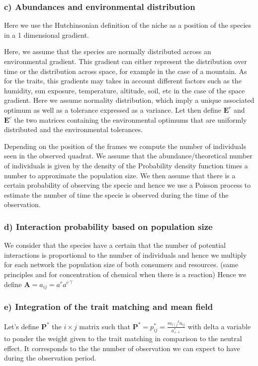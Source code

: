 \documentclass{article}
\begin{document}
\subsubsection{c) Abundances and environmental distribution}
Here we use the Hutchinsonian definition of the niche as a position of the species in a 1 dimensional gradient.

Here, we assume that the species are normally distributed across an environmental gradient. This gradient can either represent the distribution over time or the distribution across space, for example in the case of a mountain. As for the traits, this gradients may takes in account different factors such as the humidity, sun exposure, temperature, altitude, soil, etc in the case of the space gradient.
Here we assume normality distribution, which imply a unique associated optimum as well as a tolerance expressed as a variance. Let then define $\textbf{E}^r$ and $\textbf{E}^c$ the two matrices containing the environmental optimums that are uniformly distributed and the environmental tolerances.

Depending on the position of the frames we compute the number of individuals seen in the observed quadrat. We assume that the abundance/theoretical number of individuals is given by the density of the Probability density function times a number to approximate the population size. We then assume that there is a certain probability of observing the specie and hence we use a Poisson process to estimate the number of time the specie is observed during the time of the observation.


\subsubsection{d) Interaction probability based on population size}
We consider that the species have a certain that the number of potential interactions is proportional to the number of individuals and hence we multiply for each network the population size of both consumers and resources. (same principles and for concentration of chemical when there is a reaction)
Hence we define $\textbf{A} = a_{ij} = a^r a^{c\intercal}$




\subsubsection{e) Integration of the trait matching and mean field}
Let's define $\textbf{P}^*$ the $i \times j$ matrix such that $\textbf{P}^* = p^*_{ij} = \frac{{m_{i\mid j}}^\delta a_{ij}}{a_{++}^*}$ with delta a variable to ponder the weight given to the trait matching in comparison to the neutral effect.
It corresponds to the the number of observation we can expect to have during the observation period.
\end{document}
